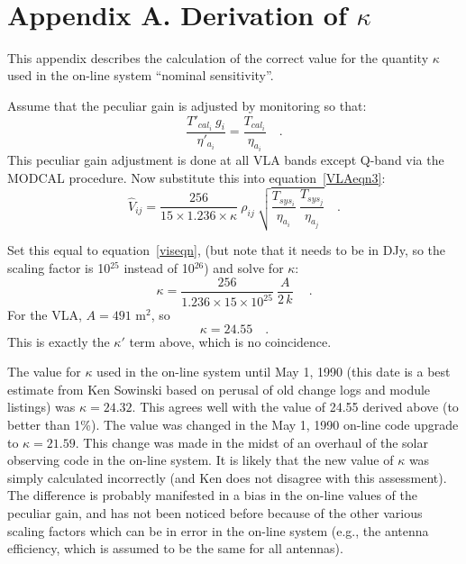 \documentclass[11pt]{article}
\begin{document}
\

\section*{Appendix A.  Derivation of $\kappa$}

This appendix describes the calculation of the correct value for the
quantity $\kappa$ used in the on-line system ``nominal sensitivity''.

Assume that the peculiar gain is adjusted by monitoring so that:
\begin{equation}
   \frac{T'_{cal_i} \ g_i}{\eta'_{a_i}} = \frac{T_{cal_i}}{\eta_{a_i}}
   \quad .
\end{equation}
This peculiar gain adjustment is done at all VLA bands except Q-band
via the MODCAL procedure.  Now substitute this into
equation~\ref{VLAeqn3}:
\begin{equation}
   \hat{V}_{ij} = \frac{256}{15 \times 1.236 \times \kappa} \ \rho_{ij}\
      \sqrt{\frac{T_{sys_i}}{\eta_{a_i}} \
            \frac{T_{sys_j}}{\eta_{a_j}} } \quad .
\end{equation}

Set this equal to equation~\ref{viseqn}, (but note that it needs to be
in DJy, so the scaling factor is 10$^{25}$ instead of 10$^{26}$) and
solve for $\kappa$:
\begin{equation}
   \kappa = \frac{256}{1.236 \times 15 \times 10^{25}} \
            \frac{A}{2 \, k} \
   \quad .
\end{equation}
For the VLA, $A = 491$ m$^2$, so
\begin{equation}
   \kappa = 24.55 \quad .
\end{equation}
This is exactly the $\kappa'$ term above, which is no coincidence.

The value for $\kappa$ used in the on-line system until May 1, 1990
(this date is a best estimate from Ken Sowinski based on perusal of old
change logs and module listings) was $\kappa = 24.32$.  This agrees well
with the value of 24.55 derived above (to better than 1\%).  The value
was changed in the May 1, 1990 on-line code upgrade to $\kappa = 21.59$.
This change was made in the midst of an overhaul of the solar observing
code in the on-line system.  It is likely that the new value of $\kappa$
was simply calculated incorrectly (and Ken does not disagree with this
assessment).  The difference is probably manifested in a bias in the
on-line values of the peculiar gain, and has not been noticed before
because of the other various scaling factors which can be in error in
the on-line system (e.g., the antenna efficiency, which is assumed to
be the same for all antennas).
\end{document}
